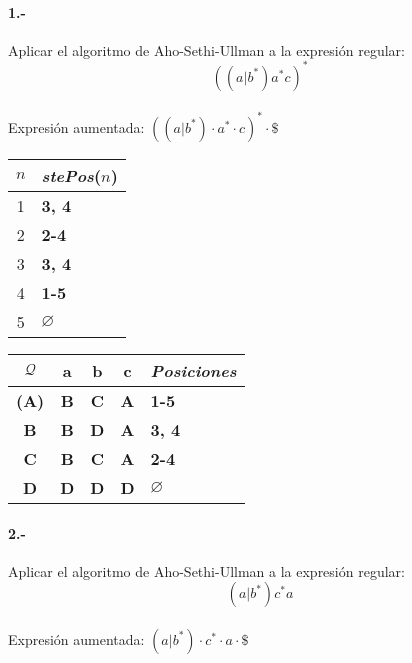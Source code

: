 \documentclass[11pt,a4paper,table,answers]{exam} %
\newcommand{\h}[1]{\ifprintanswers\textcolor{azul}{\bf#1}\else{\phantom{\bf#1}}\fi}
\newlength{\graphicheigth}
\newcommand{\myincludegraphicssol}[1]{%
    \sbox{\graphicbox}{%
        \begin{adjustbox}{max size={\textwidth}{\textheight}}
            \texttt{[image: \#1]}
        \end{adjustbox}
    }
    \settoheight{\graphicheigth}{\usebox{\graphicbox}}
    \addtolength{\graphicheigth}{4ex} %
    \ifprintanswers
        \begin{center}
            \usebox{\graphicbox}
        \end{center} 
    \else
        \makeemptybox{\graphicheigth}
    \fi
}
\begin{document}
\paragraph{1.-}\label{p1}
Aplicar el algoritmo de Aho-Sethi-Ullman a la expresión regular:
\[
    ((a|b^*)a^*c)^*
\]
~\\
Expresión aumentada: \h{$ ((a|b^*)\cdot a^*\cdot c)^*\cdot \$  $} \\

\myincludegraphicssol{}
\begin{tabular} {c@{\hspace{4mm}}l}
\toprule %
$n$ & \emph{stePos}($n$) \\
\midrule %
1 & \h{3, 4} \\ 
2 & \h{2-4} \\ 
3 & \h{3, 4} \\ 
4 & \h{1-5} \\ 
5 & \h{$\varnothing$} \\ 
\bottomrule %
\end{tabular}
\quad
{}
\begin{tabular} {c@{\hspace{4mm}}ccc@{\hspace{4mm}}l}
\toprule %
$\mathcal{Q}$ & a & b & c & \emph{Posiciones}\\ 
\midrule %
\h{(A)} & \h{B} & \h{C} & \h{A} & \h{1-5}\\ 
\h{B} & \h{B} & \h{D} & \h{A} & \h{3, 4}\\ 
\h{C} & \h{B} & \h{C} & \h{A} & \h{2-4}\\ 
\h{D} & \h{D} & \h{D} & \h{D} & \h{$\varnothing$}\\ 
\bottomrule %
\end{tabular}

\paragraph{2.-}\label{p2}
Aplicar el algoritmo de Aho-Sethi-Ullman a la expresión regular:
\[
    (a|b^*)c^*a
\]
~\\
Expresión aumentada: \h{$ (a|b^*)\cdot c^*\cdot a\cdot \$  $} \\
\end{document}
